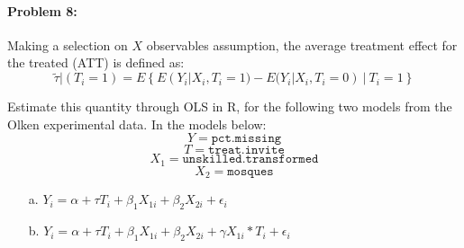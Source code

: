 \documentclass{article}
\begin{document}
\paragraph{Problem 8:}

Making a selection on $X$ observables assumption,  the average
treatment effect for the treated (ATT) is defined as: 
$$
\tilde{\tau}|(T_i=1) = E\left\{ E(Y_i|X_i,T_i=1) -E(Y_i|X_i,T_i=0)\  |\ T_i=1\right\} 
$$


\noindent Estimate this quantity through OLS in R, for the following
two models from the Olken experimental data. In the models below:
$$
Y =  \texttt{pct.missing}
$$
$$
T = \texttt{treat.invite}
$$
$$
X_{1} = \texttt{unskilled.transformed}
$$
$$
X_{2} = \texttt{mosques}
$$


\begin{itemize}
\item[a.] $Y_i = \alpha + \tau
 T_i + \beta_1X_{1i}+\beta_2X_{2i}+\epsilon_i$
\item[b.] $Y_i = \alpha + \tau
 T_i + \beta_1X_{1i}+\beta_2X_{2i}+\gamma X_{1i}*T_i+\epsilon_i$
\end{itemize}

 
\end{document}
